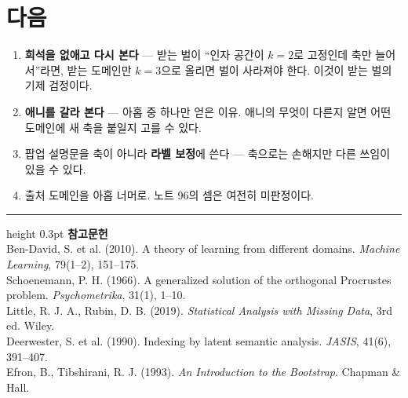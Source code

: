 \documentclass[10pt]{article}
\begin{document}
\section{다음}

\begin{enumerate}[leftmargin=1.3em,itemsep=0.15em]
\item \textbf{희석을 없애고 다시 본다} --- 받는 벌이 ``인자 공간이 $k{=}2$로
      고정인데 축만 늘어서''라면, 받는 도메인만 $k{=}3$으로 올리면 벌이
      사라져야 한다. 이것이 받는 벌의 기제 검정이다.
\item \textbf{애니를 갈라 본다} --- 아홉 중 하나만 얻은 이유. 애니의 무엇이
      다른지 알면 어떤 도메인에 새 축을 붙일지 고를 수 있다.
\item 팝업 설명문을 축이 아니라 \textbf{라벨 보정}에 쓴다 --- 축으로는
      손해지만 다른 쓰임이 있을 수 있다.
\item 출처 도메인을 아홉 너머로. 노트 96의 셈은 여전히 미판정이다.
\end{enumerate}

\vspace{0.6em}
\hrule height 0.3pt
\vspace{0.5em}
{\footnotesize
\textbf{참고문헌}\\[0.3em]
Ben-David, S. et al. (2010). A theory of learning from different domains.
\emph{Machine Learning}, 79(1--2), 151--175.\\[0.15em]
Schoenemann, P. H. (1966). A generalized solution of the orthogonal Procrustes
problem. \emph{Psychometrika}, 31(1), 1--10.\\[0.15em]
Little, R. J. A., Rubin, D. B. (2019). \emph{Statistical Analysis with Missing
Data}, 3rd ed. Wiley.\\[0.15em]
Deerwester, S. et al. (1990). Indexing by latent semantic analysis.
\emph{JASIS}, 41(6), 391--407.\\[0.15em]
Efron, B., Tibshirani, R. J. (1993). \emph{An Introduction to the Bootstrap}.
Chapman \& Hall.
}
\end{document}
